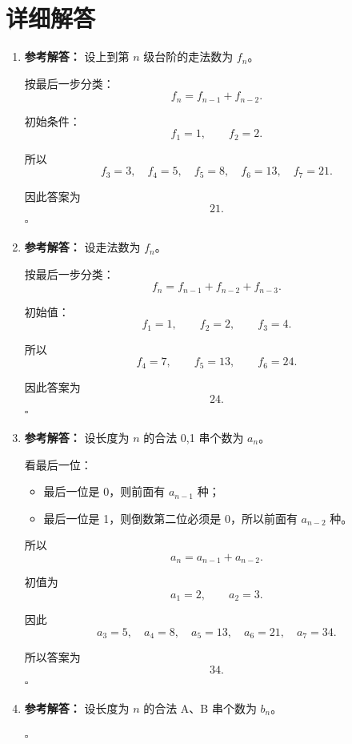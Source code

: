 \documentclass[11pt,a4paper,fontset=fandol]{ctexart}
\newenvironment{solution}{\par\noindent\textbf{参考解答：}}{\hfill$\square$\par}
\begin{document}
\newpage
\section{详细解答}

\begin{enumerate}
  \item \begin{solution}
  设上到第 $n$ 级台阶的走法数为 $f_n$。

  按最后一步分类：
  \[
  f_n=f_{n-1}+f_{n-2}.
  \]

  初始条件：
  \[
  f_1=1,\qquad f_2=2.
  \]

  所以
  \[
  f_3=3,\quad f_4=5,\quad f_5=8,\quad f_6=13,\quad f_7=21.
  \]

  因此答案为
  \[
  21.
  \]
  \end{solution}

  \item \begin{solution}
  设走法数为 $f_n$。

  按最后一步分类：
  \[
  f_n=f_{n-1}+f_{n-2}+f_{n-3}.
  \]

  初始值：
  \[
  f_1=1,\qquad f_2=2,\qquad f_3=4.
  \]

  所以
  \[
  f_4=7,\qquad f_5=13,\qquad f_6=24.
  \]

  因此答案为
  \[
  24.
  \]
  \end{solution}

  \item \begin{solution}
  设长度为 $n$ 的合法 0,1 串个数为 $a_n$。

  看最后一位：
  \begin{itemize}
    \item 最后一位是 0，则前面有 $a_{n-1}$ 种；
    \item 最后一位是 1，则倒数第二位必须是 0，所以前面有 $a_{n-2}$ 种。
  \end{itemize}

  所以
  \[
  a_n=a_{n-1}+a_{n-2}.
  \]

  初值为
  \[
  a_1=2,\qquad a_2=3.
  \]

  因此
  \[
  a_3=5,\quad a_4=8,\quad a_5=13,\quad a_6=21,\quad a_7=34.
  \]

  所以答案为
  \[
  34.
  \]
  \end{solution}

  \item \begin{solution}
  设长度为 $n$ 的合法 A、B 串个数为 $b_n$。


\end{solution}
\end{enumerate}
\end{document}
